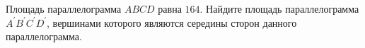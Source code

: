 \begin{ex}
	\begin{condition}
		Площадь параллелограмма \(ABCD\) равна \( 164 \). Найдите площадь параллелограмма \( A^{'} B^{'} C^{'} D^{'} \), вершинами которого являются середины сторон данного параллелограмма.
	\end{condition}
\end{ex}